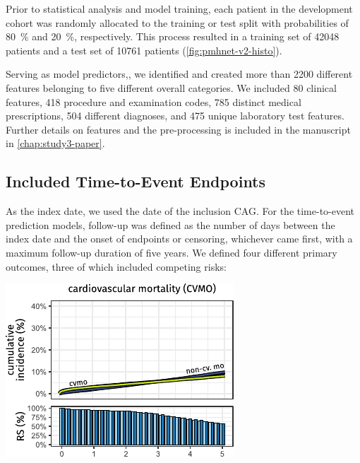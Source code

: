 Prior to statistical analysis and  model training, 
each patient in the development cohort was randomly allocated to the 
training or test split with probabilities of 
\qty{80}{\percent} and \qty{20}{\percent}, 
respectively.
This process resulted in 
a training set of \num{42048} patients 
and a test set of \num{10761} patients
(\cref{fig:pmhnet-v2-histo}).

Serving as model predictors,, 
we identified and created more than 2200 different
features belonging to five different overall categories.
We included 80 clinical features, 418 procedure and examination codes,
785 distinct medical prescriptions, 504 different diagnoses, 
and 475 unique laboratory test features.
Further details on features and the pre-processing 
is included in the manuscript in \cref{chap:study3-paper}.

\subsection{Included Time-to-Event Endpoints}

As the index date, we used the date of the inclusion \ac{CAG}.
For the  time-to-event prediction models, 
follow-up was defined as the number of days 
between the index date and the onset of endpoints or censoring,
whichever came first, 
with a maximum follow-up duration of five years.
We defined four different primary outcomes, 
three of which included competing risks:

\begin{marginfigure}[2em]%
    \includegraphics[trim=5mm 0 0 0]{graphics/pmhnet-v2-cvmo-cic.pdf}
    \caption[Cumulative incidence of the  outcome]{%
        Cause-specific cumulative incidence functions for the 
         outcome (cvmo) and the competing endpoint 
        \enquote{non-cardiovascular} mortality. (non-cv. mo). 
        The bottom panels shows the proportion of train/test patients
        still at risk (i.e. non-censored and still alive) 
        at each two-month period following the index \acs{CAG}.}
    \label{fig:pmhnet-v2-cic}
\end{marginfigure}

